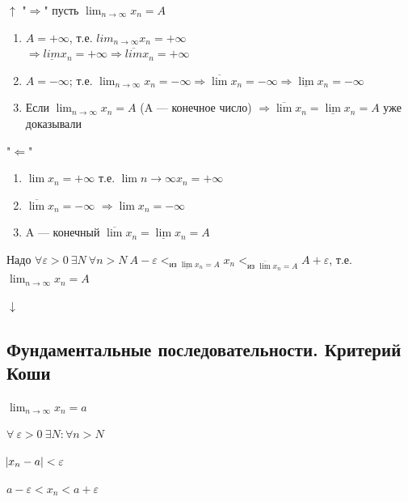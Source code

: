 \documentclass{article}
\begin{document}
    \(\uparrow\)
    "\(\Rightarrow\)" пусть \(\lim_{n \rightarrow \infty}{x_n} = A\)

    \begin{enumerate}
        \item \( A = +\infty \), т.е. \( lim_{n \rightarrow \infty}x_n = +\infty \)\\
        \( \Rightarrow \underline{lim}x_n = +\infty \Rightarrow \overline{lim}x_n = +\infty \)
        \item \(A = -\infty\); т.е. \(\lim_{n \rightarrow \infty}{x_n} = -\infty \Rightarrow \overline{\lim}x_n = -\infty \Rightarrow \underline{\lim}x_n = -\infty\)
        \item Если \( \lim_{n \rightarrow \infty}x_n = A \) (A --- конечное число) \( \Rightarrow \overline{\lim}x_n = \underline{\lim}x_n = A \) уже доказывали
    \end{enumerate}

    "\( \Leftarrow \)"
    \begin{enumerate}
        \item \(\lim x_n = +\infty\)
        т.е. \(\lim{n \rightarrow \infty}{x_n} = +\infty\)
        
        \item \( \overline{\lim}x_n = -\infty \) 
        \( \Rightarrow \lim x_n = -\infty \)

        \item A --- конечный \(\overline{\lim} x_n = \underline{\lim} x_n = A\)
    \end{enumerate}
    Надо \( \forall \varepsilon > 0\ \exists N\ \forall n > N\ A - \varepsilon <_{\textrm{из } \underline{\lim}x_n = A} x_n <_{\textrm{из } \overline{\lim}x_n = A} A + \varepsilon \), т.е. \( \lim_{n \rightarrow \infty}x_n = A \)
    
    \( \downarrow \)

    \subsection{Фундаментальные последовательности. Критерий Коши}

    \(\lim_{n \rightarrow \infty}{x_n} = a\)

    \( \forall\ \varepsilon > 0\ \exists N: \forall n > N \)

    \( \abs{x_n - a} < \varepsilon \)

    \( a - \varepsilon < x_n < a + \varepsilon \)
\end{document}

